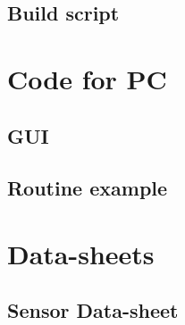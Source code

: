 \documentclass[12pt,a4paper, twoside]{article}
\begin{document}
\subsection{Build script}


\section{Code for PC}
\subsection{GUI}
%
\subsection{Routine example}
%
\section{Data-sheets}
\subsection{Sensor Data-sheet }\label{app:PMW3660}
%
%
\end{document}
